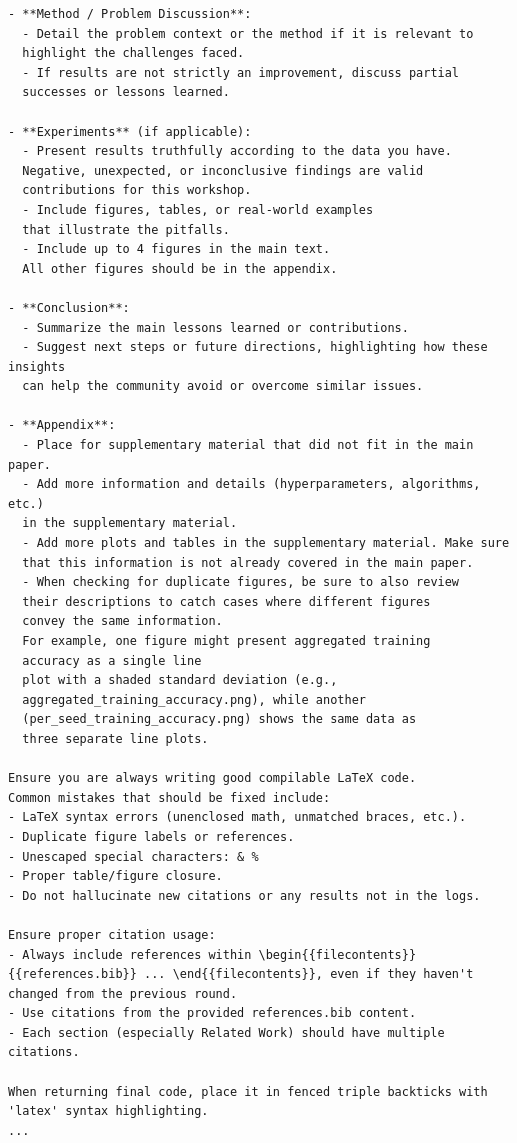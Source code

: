 \documentclass[11pt, a4paper]{include/gdm_format}
\begin{document}
\begin{tcolorbox}[breakable, colback=orange!5!white, colframe=orange!75!black, title=Writeup Prompt (ICBINB workshop specific)]
\begin{verbatim}
- **Method / Problem Discussion**:
  - Detail the problem context or the method if it is relevant to 
  highlight the challenges faced.
  - If results are not strictly an improvement, discuss partial 
  successes or lessons learned.

- **Experiments** (if applicable):
  - Present results truthfully according to the data you have. 
  Negative, unexpected, or inconclusive findings are valid 
  contributions for this workshop.
  - Include figures, tables, or real-world examples 
  that illustrate the pitfalls.
  - Include up to 4 figures in the main text. 
  All other figures should be in the appendix.

- **Conclusion**:
  - Summarize the main lessons learned or contributions.
  - Suggest next steps or future directions, highlighting how these insights 
  can help the community avoid or overcome similar issues.

- **Appendix**:
  - Place for supplementary material that did not fit in the main paper.
  - Add more information and details (hyperparameters, algorithms, etc.) 
  in the supplementary material.
  - Add more plots and tables in the supplementary material. Make sure 
  that this information is not already covered in the main paper.
  - When checking for duplicate figures, be sure to also review 
  their descriptions to catch cases where different figures 
  convey the same information. 
  For example, one figure might present aggregated training 
  accuracy as a single line 
  plot with a shaded standard deviation (e.g., 
  aggregated_training_accuracy.png), while another 
  (per_seed_training_accuracy.png) shows the same data as 
  three separate line plots.

Ensure you are always writing good compilable LaTeX code. 
Common mistakes that should be fixed include:
- LaTeX syntax errors (unenclosed math, unmatched braces, etc.).
- Duplicate figure labels or references.
- Unescaped special characters: & %
- Proper table/figure closure.
- Do not hallucinate new citations or any results not in the logs.

Ensure proper citation usage:
- Always include references within \begin{{filecontents}}
{{references.bib}} ... \end{{filecontents}}, even if they haven't 
changed from the previous round.
- Use citations from the provided references.bib content.
- Each section (especially Related Work) should have multiple citations.

When returning final code, place it in fenced triple backticks with 
'latex' syntax highlighting.
...


\end{verbatim}
\end{tcolorbox}
\end{document}
